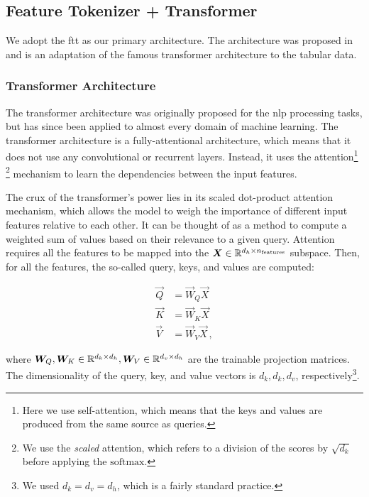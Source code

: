 \subsection{Feature Tokenizer + Transformer}
\label{sec:ftt}

We adopt the \gls{ftt} as our primary architecture. The architecture was proposed in \cite{ft-transformer} and is an
adaptation of the famous transformer architecture \cite{transformer} to the tabular data.

\subsubsection{Transformer Architecture}

The transformer architecture was originally proposed for the \gls{nlp} processing tasks, but has since been applied
to almost every domain of machine learning. The transformer architecture is a fully-attentional architecture, which
means that it does not use any convolutional \cite{convolutional} or recurrent \cite{recurrent} layers. Instead, it uses
the attention\footnote{Here we use self-attention, which means that the keys and values are produced from the same
    source as queries.}
\footnote{We use the \emph{scaled} attention, which refers to a division of the scores by $\sqrt{d_k}$ before applying
    the $\text{softmax}$.}
mechanism \cite{attention} to learn the dependencies between the input features.







The crux of the transformer's power lies in its scaled dot-product attention mechanism, which allows the model to weigh
the importance of different input features relative to each other. It can be thought of as a method to compute a
weighted sum of values based on their relevance to a given query. Attention requires all the features to be mapped into
the ${\boldsymbol{X}} \in \mathbb{R}^{d_h \times n_\text{features}}$ subspace. Then, for all the features, the so-called
query, keys, and values are computed:

\begin{align}
    \vec{Q} & = \vec{W}_Q \vec{X}    \\
    \vec{K} & = \vec{W}_K \vec{X}    \\
    \vec{V} & = \vec{W}_V \vec{X}\,,
\end{align}

where ${\boldsymbol{W}}_Q, {\boldsymbol{W}}_K \in \mathbb{R}^{d_k \times d_h}, {\boldsymbol{W}}_V \in \mathbb{R}^{d_v \times d_h}$ are the trainable projection
matrices. The dimensionality of the query, key, and value vectors is $d_k, d_k, d_v$, respectively\footnote{We used $d_k
        = d_v = d_h$, which is a fairly standard practice.}.


